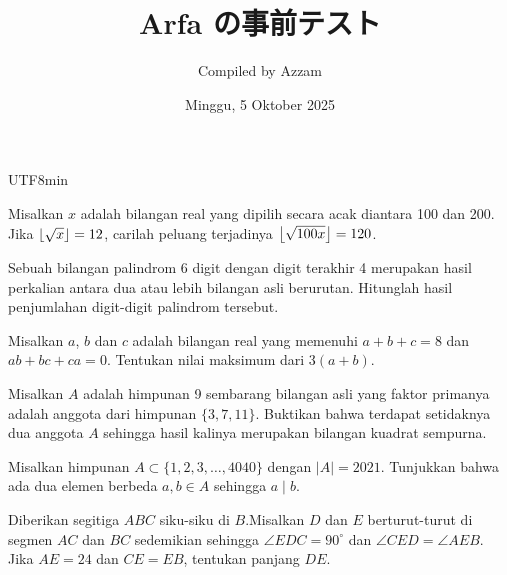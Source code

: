 \documentclass[12pt]{scrartcl}
\title{Arfa の事前テスト}
\begin{document}
\begin{CJK*}{UTF8}{min}
	
	\date{Minggu, 5 Oktober 2025}
	\author{Compiled by Azzam}
	\maketitle

\renewcommand*\contentsname{Daftar Isi}
\tableofcontents

\newpage
	
	\begin{soalbaru}
	Misalkan $x$ adalah bilangan real yang dipilih secara acak diantara 100 dan 200. Jika $\left\lfloor \sqrt{x} \right\rfloor=12$, carilah peluang terjadinya $\left\lfloor \sqrt{100x} \right\rfloor=120$.
	\end{soalbaru}

    \begin{soalbaru}
        Sebuah bilangan palindrom 6 digit dengan digit terakhir 4 merupakan hasil perkalian antara dua atau lebih bilangan asli berurutan. Hitunglah hasil penjumlahan digit-digit palindrom tersebut.
    \end{soalbaru}

    \begin{soalbaru}
        Misalkan $a$, $b$ dan $c$ adalah bilangan real yang memenuhi $a + b + c = 8$ dan $ab + bc + ca = 0$.
Tentukan nilai maksimum dari $3(a + b)$.
    \end{soalbaru}

    \begin{soalbaru}
    Misalkan $A$ adalah himpunan 9 sembarang bilangan asli yang faktor primanya adalah anggota dari himpunan $\{3,7,11\}$. Buktikan bahwa terdapat setidaknya dua anggota $A$ sehingga hasil kalinya merupakan bilangan kuadrat sempurna.
\end{soalbaru}

\begin{soalbaru}
    Misalkan himpunan $A \subset \{1,2,3,\dots,4040\}$ dengan $|A| = 2021$. Tunjukkan bahwa ada dua elemen berbeda $a,b \in A$ sehingga $a \mid b$.
\end{soalbaru}
	
	\begin{soalbaru}
	Diberikan segitiga $ABC$ siku-siku di $B$.Misalkan $D$ dan $E$ berturut-turut di segmen $AC$ dan $BC$ sedemikian sehingga $\angle EDC= 90^\circ$ dan $\angle CED = \angle AEB$. Jika $AE = 24$ dan $CE=EB$, tentukan panjang $DE$.
	\end{soalbaru}
	

\end{CJK*}
\end{document}
